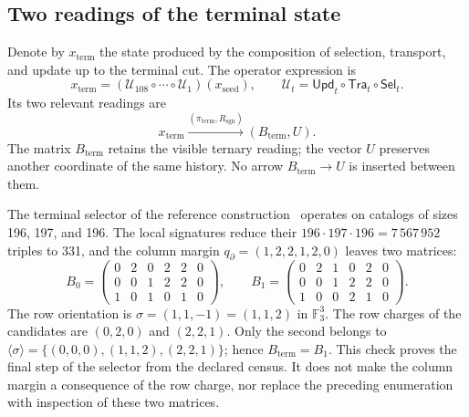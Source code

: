 

\subsection{Two readings of the terminal state}
\label{subsec:k-terminal}

Denote by \(x_{\mathrm{term}}\) the state produced by the composition
of selection, transport, and update up to the terminal cut. The
operator expression is
\[
 x_{\mathrm{term}}=
 (\mathcal U_{108}\circ\cdots\circ\mathcal U_1)(x_{\mathrm{seed}}),
 \qquad \mathcal U_t=\mathsf{Upd}_t\circ\mathsf{Tra}_t\circ\mathsf{Sel}_t.
\]
Its two relevant readings are
\[
 x_{\mathrm{term}}
 \xrightarrow{(\pi_{\mathrm{term}},R_{\mathrm{sgn}})}
 (B_{\mathrm{term}},U).
\]
The matrix \(B_{\mathrm{term}}\) retains the visible ternary reading; the
vector \(U\) preserves another coordinate of the same history. No arrow
\(B_{\mathrm{term}}\to U\) is inserted between them.

The terminal selector of the reference construction~\cite{hmtintegral} operates on catalogs
of sizes 196, 197, and 196. The local signatures reduce their
\(196\cdot197\cdot196=7\,567\,952\) triples to 331, and the column
margin \(q_{\partial}=(1,2,2,1,2,0)\) leaves two matrices:
\[
 B_0=\begin{pmatrix}0&2&0&2&2&0\\0&0&1&2&2&0\\1&0&1&0&1&0\end{pmatrix},
 \qquad
 B_1=\begin{pmatrix}0&2&1&0&2&0\\0&0&1&2&2&0\\1&0&0&2&1&0\end{pmatrix}.
\]
The row orientation is \(\sigma=(1,1,-1)=(1,1,2)\) in
\(\mathbb F_3^3\). The row charges of the candidates are
\((0,2,0)\) and \((2,2,1)\). Only the second belongs to
\(\langle\sigma\rangle=\{(0,0,0),(1,1,2),(2,2,1)\}\); hence
\(B_{\mathrm{term}}=B_1\). This check proves the final step of the
selector from the declared census. It does not make the column margin
a consequence of the row charge, nor replace the preceding enumeration
with inspection of these two matrices.

